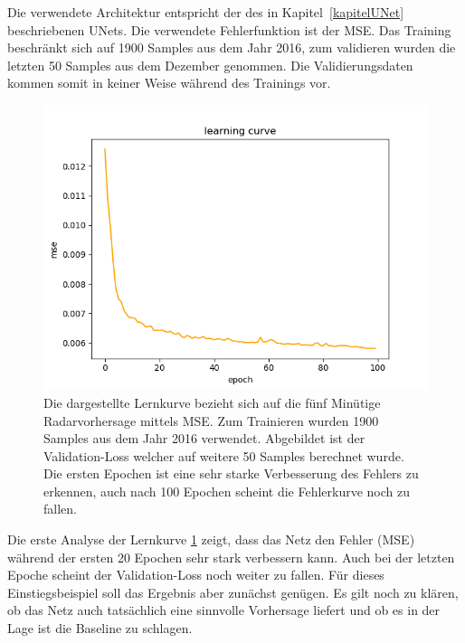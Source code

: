 Die verwendete Architektur entspricht der des in Kapitel~\ref{kapitelUNet} beschriebenen UNets. Die verwendete Fehlerfunktion ist der MSE. Das Training beschränkt sich auf 1900 Samples aus dem Jahr 2016, zum validieren wurden die letzten 50 Samples aus dem Dezember genommen. Die Validierungsdaten kommen somit in keiner Weise während des Trainings vor.
\begin{figure}[h]
	\centering
	\includegraphics[width=\linewidth]{pics/mse_learncurve}
	\caption[Lernkurve des UNets zur fünf Minuten Vorhersage]{Die dargestellte Lernkurve bezieht sich auf die fünf Minütige Radarvorhersage mittels MSE. Zum Trainieren wurden 1900 Samples aus dem Jahr 2016 verwendet. Abgebildet ist der Validation-Loss welcher auf weitere 50 Samples berechnet wurde. Die ersten Epochen ist eine sehr starke Verbesserung des Fehlers zu erkennen, auch nach 100 Epochen scheint die Fehlerkurve noch zu fallen.}
	\label{mseLC}
\end{figure}

Die erste Analyse der Lernkurve \ref{mseLC} zeigt, dass das Netz den Fehler (MSE) während der ersten 20 Epochen sehr stark verbessern kann. Auch bei der letzten Epoche scheint der Validation-Loss noch weiter zu fallen. Für dieses Einstiegsbeispiel soll das Ergebnis aber zunächst genügen. Es gilt noch zu klären, ob das Netz auch tatsächlich eine sinnvolle Vorhersage liefert und ob es in der Lage ist die Baseline zu schlagen. 

